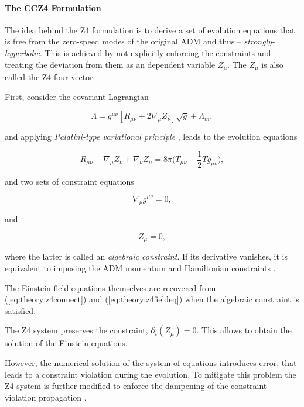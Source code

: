 \paragraph{The CCZ4 Formulation}


The idea behind the Z4 formulation is to derive a set of evolution equations that is free from the zero-speed modes of the original ADM and thus -- \textit{strongly-hyperbolic}. 
This is achieved by not explicitly enforcing the constraints and treating the deviation from them as an dependent variable $Z_{\mu}$. The $Z_{\mu}$ is also called the Z4 four-vector.

First, consider the covariant Lagrangian

\begin{equation}
\Lambda = g^{\mu\nu}[R_{\mu\nu} + 2\nabla_{\mu}Z_{\nu}]\sqrt{g} + \Lambda_m,
\end{equation}

and applying \textit{Palatini-type variational principle} \cite{Bona:2010is}, leads to the evolution equations

\begin{equation}
R_{\mu\nu} + \nabla_{\mu}Z_{\nu} + \nabla_{\nu}Z_{\mu}=8\pi\Big(T_{\mu\nu} - \frac{1}{2}Tg_{\mu\nu}\Big),
\label{eq:theory:z4fieldeq}
\end{equation}

and two sets of constraint equations

\begin{equation}
\nabla_{\rho} g^{\mu\nu} = 0, 
\label{eq:theory:z4connect}
\end{equation}

and

\begin{equation}
Z_{\mu} = 0,
\end{equation}

where the latter is called an \textit{algebraic constraint}. 
If its derivative vanishes, it is equivalent to imposing the ADM momentum and Hamiltonian constraints \cite{Bona:2009}. 

The Einstein field equations themselves are recovered from (\ref{eq:theory:z4connect}) and (\ref{eq:theory:z4fieldeq}) when the algebraic constraint is satisfied. 

The Z4 system preserves the constraint, $\partial_t (Z_{\mu})= 0$. 
This allows to obtain the solution of the Einstein equations. 

However, the numerical solution of the system of equations introduces error, that leads to a constraint violation during the evolution. 
To mitigate this problem the Z4 system is further modified to enforce the dampening of the constraint violation propagation \cite{Gundlach:2005eh}.

